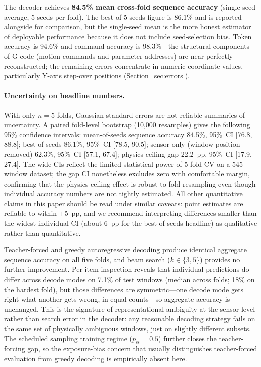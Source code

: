 \documentclass[sensors,article,submit,moreauthors,pdftex]{Definitions/mdpi}
\begin{document}
The decoder achieves \textbf{84.5\% mean cross-fold sequence accuracy} (single-seed average, 5 seeds per fold). The best-of-5-seeds figure is 86.1\% and is reported alongside for comparison, but the single-seed mean is the more honest estimator of deployable performance because it does not include seed-selection bias. Token accuracy is 94.6\% and command accuracy is 98.3\%---the structural components of G-code (motion commands and parameter addresses) are near-perfectly reconstructed; the remaining errors concentrate in numeric coordinate values, particularly Y-axis step-over positions (Section~\ref{sec:errors}).

\paragraph{Uncertainty on headline numbers.} With only $n=5$ folds, Gaussian standard errors are not reliable summaries of uncertainty. A paired fold-level bootstrap (10{,}000 resamples) gives the following 95\% confidence intervals: mean-of-seeds sequence accuracy 84.5\%, 95\%~CI [76.8, 88.8]; best-of-seeds 86.1\%, 95\%~CI [78.5, 90.5]; sensor-only (window position removed) 62.3\%, 95\%~CI [57.1, 67.4]; physics-ceiling gap 22.2~pp, 95\%~CI [17.9, 27.4]. The wide CIs reflect the limited statistical power of 5-fold CV on a 545-window dataset; the gap CI nonetheless excludes zero with comfortable margin, confirming that the physics-ceiling effect is robust to fold resampling even though individual accuracy numbers are not tightly estimated. All other quantitative claims in this paper should be read under similar caveats: point estimates are reliable to within $\pm$5~pp, and we recommend interpreting differences smaller than the widest individual CI (about 6~pp for the best-of-seeds headline) as qualitative rather than quantitative.

Teacher-forced and greedy autoregressive decoding produce identical aggregate sequence accuracy on all five folds, and beam search ($k \in \{3, 5\}$) provides no further improvement. Per-item inspection reveals that individual predictions do differ across decode modes on 7.1\% of test windows (median across folds; 18\% on the hardest fold), but those differences are symmetric---one decode mode gets right what another gets wrong, in equal counts---so aggregate accuracy is unchanged. This is the signature of representational ambiguity at the sensor level rather than search error in the decoder: any reasonable decoding strategy fails on the same set of physically ambiguous windows, just on slightly different subsets. The scheduled sampling training regime ($p_\text{ss} = 0.5$) further closes the teacher-forcing gap, so the exposure-bias concern that usually distinguishes teacher-forced evaluation from greedy decoding is empirically absent here.
\end{document}
